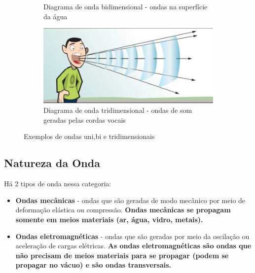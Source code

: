 \documentclass[12pt]{extarticle}
\newcommand{\<}{\langle}
\renewcommand{\>}{\rangle}
\theoremstyle{definition}
\begin{document}
\begin{figure}[H]
\begin{subfigure}[b]{0.3\textwidth}
         \caption{Diagrama de onda bidimensional - ondas na superfície da água}
         \label{fig:bidimensional}
     \end{subfigure}
     \hfill
     \begin{subfigure}[b]{0.3\textwidth}
         \centering
         \includegraphics[width=\textwidth]{tridimensionais.png}
         \caption{Diagrama de onda tridimensional - ondas de som geradas pelas cordas vocais}
         \label{fig:tridimensionais}
     \end{subfigure}
        \caption{Exemplos de ondas uni,bi e tridimensionais}
        \label{fig:ondas_propagacao}
\end{figure}

\subsection{Natureza da Onda}
Há 2 tipos de onda nessa categoria:
\begin{itemize}
    \item \textbf{Ondas mecânicas} - ondas que são geradas de modo mecânico por meio de deformação elástica ou compressão. \textbf{Ondas mecânicas se propagam somente em meios materiais (ar, água, vidro, metais).}
    \item \textbf{Ondas eletromagnéticas} - ondas que são geradas por meio da oscilação ou aceleração de cargas elétricas. \textbf{As ondas eletromagnéticas são ondas que não precisam de meios materiais para se propagar (podem se propagar no vácuo) e são ondas transversais.}
\end{itemize}
\end{document}
